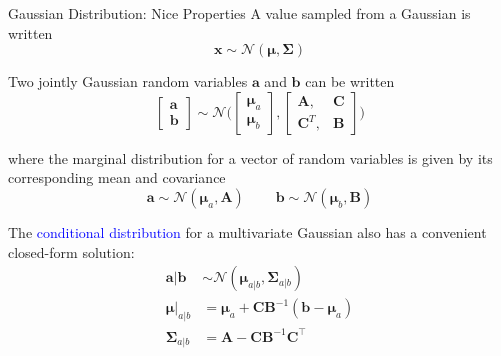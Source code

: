 \documentclass{beamer}
\begin{document}
\begin{frame}{Gaussian Distribution: Nice Properties}
A value sampled from a Gaussian is written 
\begin{equation*}
    \boldsymbol{x} \sim \mathcal{N}(\boldsymbol{\mu}, \boldsymbol{\Sigma})
\end{equation*}

Two jointly Gaussian random variables $\boldsymbol{a}$ and $\boldsymbol{b}$ can be written
\begin{equation*}
    \begin{bmatrix} 
    \boldsymbol{a}\\
    \boldsymbol{b}
    \end{bmatrix}
    \sim \mathcal{N}\bigg(
    \begin{bmatrix}
    \boldsymbol{\mu}_a \\
    \boldsymbol{\mu}_b
    \end{bmatrix},
    \begin{bmatrix}
    \boldsymbol{A}, &\boldsymbol{C} \\
    \boldsymbol{C}^T,& \boldsymbol{B}
    \end{bmatrix}
    \bigg)
\end{equation*}

where the marginal distribution for a vector of random variables is given by its corresponding mean and covariance
\begin{equation*}
    \boldsymbol{a} \sim \mathcal{N}(\boldsymbol{\mu}_a, \boldsymbol{A}) ~~~~~~~~~~
    \boldsymbol{b} \sim \mathcal{N}(\boldsymbol{\mu}_b, \boldsymbol{B}) 
\end{equation*}

The \textcolor{blue}{conditional distribution} for a multivariate Gaussian also has a convenient closed-form solution:
\begin{equation*}
\begin{split}
    \boldsymbol{a} | \boldsymbol{b} & \sim \mathcal{N}(\boldsymbol{\mu}_{a|b}, \boldsymbol{\Sigma}_{a|b}) \\ 
    \boldsymbol{\mu}|_{a|b} &= \boldsymbol{\mu}_{a} + \boldsymbol{CB}^{-1}(\boldsymbol{b} - \boldsymbol{\mu}_{a})\\
    \boldsymbol{\Sigma}_{a|b} &= \boldsymbol{A} − \boldsymbol{CB}^{−1}\boldsymbol{C}^⊤    
\end{split}
\end{equation*}

\end{frame}
\end{document}
